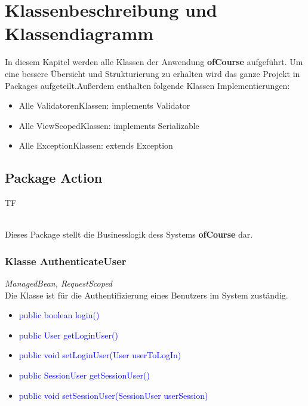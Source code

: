 	\newcommand{\class}[1]{\paragraph{Klasse #1:}\ \\ }
	\newcommand{\method}[1]{\textcolor{blue}{#1}}
	\newcommand{\kursiv}[1]{{\it #1}}
	\newcommand{\override}{{\it @Override}\ \\}
	
	\chapter{Klassenbeschreibung und Klassendiagramm}
	In diesem Kapitel werden alle Klassen der Anwendung \textbf{ofCourse} aufgeführt.
	Um eine bessere Übersicht und Strukturierung zu erhalten wird das ganze Projekt in Packages aufgeteilt.Außerdem enthalten folgende Klassen Implementierungen:
	\begin{itemize}
		\item Alle ValidatorenKlassen: implements Validator
		\item Alle ViewScopedKlassen: implements Serializable
		\item Alle ExceptionKlassen: extends Exception
	\end{itemize}

	\section{Package Action}
		\begin{tiny}
			TF\\
		\end{tiny}\\
	Dieses Package stellt die Businesslogik dess Systems \textbf{ofCourse} dar.
	\subsection{Klasse AuthenticateUser}
	\kursiv{ManagedBean, RequestScoped}\\
	Die Klasse ist für die Authentifizierung eines Benutzers im System zuständig.
	\begin{itemize}
		\item \method{public boolean login()}
		\item \method{public User getLoginUser()}
		\item \method{public void setLoginUser(User userToLogIn)}
		\item \method{public SessionUser getSessionUser()}
		\item \method{public void setSessionUser(SessionUser userSession)}
	\end{itemize}
	
